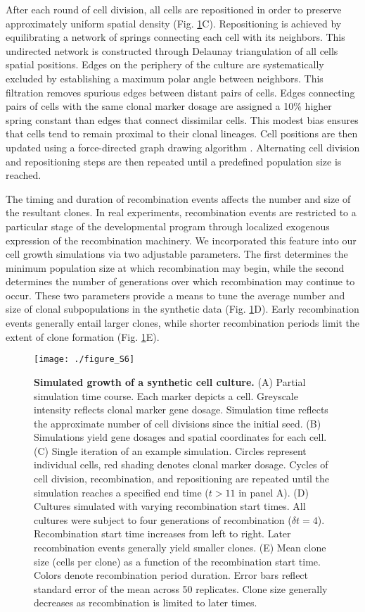 After each round of cell division, all cells are repositioned in order to preserve approximately uniform spatial density (Fig. \ref{fig:clones:figS6}C). Repositioning is achieved by equilibrating a network of springs connecting each cell with its neighbors. This undirected network is constructed through Delaunay triangulation of all cells spatial positions. Edges on the periphery of the culture are systematically excluded by establishing a maximum polar angle between neighbors. This filtration removes spurious edges between distant pairs of cells. Edges connecting pairs of cells with the same clonal marker dosage are assigned a 10\% higher spring constant than edges that connect dissimilar cells. This modest bias ensures that cells tend to remain proximal to their clonal lineages. Cell positions are then updated using a force-directed graph drawing algorithm \cite{Kamada1989}. Alternating cell division and repositioning steps are then repeated until a predefined population size is reached. 

The timing and duration of recombination events affects the number and size of the resultant clones. In real experiments, recombination events are restricted to a particular stage of the developmental program through localized exogenous expression of the recombination machinery. We incorporated this feature into our cell growth simulations via two adjustable parameters. The first determines the minimum population size at which recombination may begin, while the second determines the number of generations over which recombination may continue to occur. These two parameters provide a means to tune the average number and size of clonal subpopulations in the synthetic data (Fig. \ref{fig:clones:figS6}D). Early recombination events generally entail larger clones, while shorter recombination periods limit the extent of clone formation (Fig. \ref{fig:clones:figS6}E).

\begin{figure}[h]
\texttt{[image: ./figure\_S6]}
\caption[Simulated growth of a synthetic cell culture.]{\textbf{Simulated growth of a synthetic cell culture.} (A) Partial simulation time course. Each marker depicts a cell. Greyscale intensity reflects clonal marker gene dosage. Simulation time reflects the approximate number of cell divisions since the initial seed. (B) Simulations yield gene dosages and spatial coordinates for each cell. (C) Single iteration of an example simulation. Circles represent individual cells, red shading denotes clonal marker dosage. Cycles of cell division, recombination, and repositioning are repeated until the simulation reaches a specified end time ($t>11$ in panel A). (D) Cultures simulated with varying recombination start times. All cultures were subject to four generations of recombination ($\delta t=4$). Recombination start time increases from left to right. Later recombination events generally yield smaller clones. (E) Mean clone size (cells per clone) as a function of the recombination start time. Colors denote recombination period duration. Error bars reflect standard error of the mean across 50 replicates. Clone size generally decreases as recombination is limited to later times.}
\label{fig:clones:figS6}
\end{figure}

